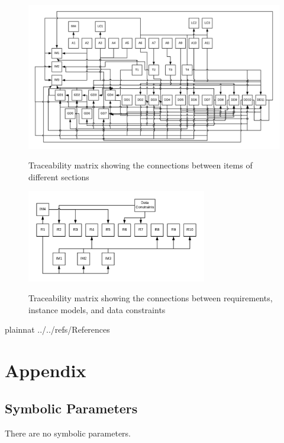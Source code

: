 \documentclass[12pt]{article}
\begin{document}
\begin{figure}[h!]
	\begin{center}
		{
			\includegraphics[width=\textwidth]{ATrace.png}
		}
		\caption{\label{Fig_ATrace} Traceability matrix showing the connections 
		between items of different sections}
	\end{center}
\end{figure}


\begin{figure}[h!]
	\begin{center}
		{
			\includegraphics[width=0.7\textwidth]{RTrace.png}
		}
		\caption{\label{Fig_RTrace} Traceability matrix showing the connections 
		between requirements, instance models, and data constraints}
	\end{center}
\end{figure}

\newpage

 {plainnat}
 {../../refs/References}

\section{Appendix}

\subsection{Symbolic Parameters}
There are no symbolic parameters.
\end{document}
